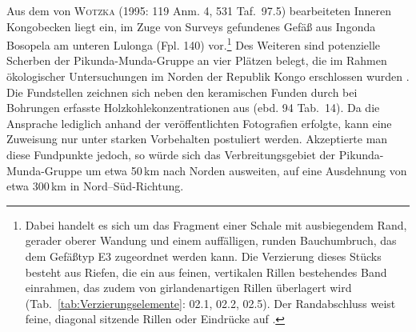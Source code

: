 Aus dem von \textsc{Wotzka} (1995: 119 Anm. 4, 531 Taf.~97.5) bearbeiteten Inneren Kongobecken liegt ein, im Zuge von Surveys gefundenes Gefäß aus Ingonda Bosopela am unteren Lulonga (Fpl. 140) vor.\footnote{Dabei handelt es sich um das Fragment einer Schale mit ausbiegendem Rand, gerader oberer Wandung und einem auffälligen, runden Bauchumbruch, das dem Gefäßtyp E3 zugeordnet werden kann. Die Verzierung dieses Stücks besteht aus Riefen, die ein aus feinen, vertikalen Rillen bestehendes Band einrahmen, das zudem von girlandenartigen Rillen überlagert wird (Tab.~\ref{tab:Verzierungselemente}: 02.1, 02.2, 02.5). Der Randabschluss weist feine, diagonal sitzende Rillen oder Eindrücke auf \parencite[Tab.~\ref{tab:Verzierungselemente}: 02.3 oder 04.12; 119 Anm. 4, 531 Taf.~97.5]{Wotzka.1995}.} Des Weiteren sind potenzielle Scherben der Pikunda-Munda-Gruppe an vier Plätzen belegt, die im Rahmen ökologischer Untersuchungen im Norden der Republik Kongo erschlossen wurden \parencite[114 Abb.~42; Abb.~\ref{fig:PIKMUN_Verbreitung}]{Gillet.2013}. Die Fundstellen zeichnen sich neben den keramischen Funden durch bei Bohrungen erfasste Holzkohlekonzentrationen aus (ebd. 94 Tab.~14). Da die Ansprache lediglich anhand der veröffentlichten Fotografien erfolgte, kann eine Zuweisung nur unter starken Vorbehalten postuliert werden. Akzeptierte man diese Fundpunkte jedoch, so würde sich das Verbreitungsgebiet der Pikunda-Munda-Gruppe um etwa 50\,km nach Norden ausweiten, auf eine Ausdehnung von etwa 300\,km in Nord--Süd-Richtung.